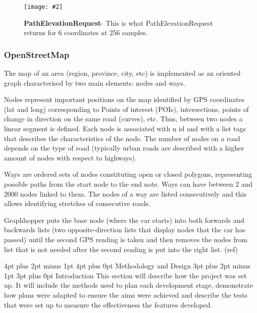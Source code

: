 \documentclass[12pt,a4paper]{article}
\makeatletter
\newcommand{\figuremacro}[5]{
    \begin{figure}[#1]
        \centering
        \texttt{[image: \#2]}
        \caption[#3]{\textbf{#3}#4}
        \label{fig:#2}
    \end{figure}
}
\renewcommand\subsection{\@startsection {subsection}{1}{0mm} %
                               {3pt plus 2pt minus 1pt} %
                               {3pt plus 0pt} %
                               {\normalfont\bfseries}}
\renewcommand\section{\@startsection {section}{1}{0mm} %
                               {4pt plus 2pt minus 1pt} %
                               {4pt plus 0pt} %
                               {\Large\bfseries}}
\makeatother
\begin{document}
\figuremacro{h}{googleElevationPath}{PathElevationRequest}{- This is what PathElevationRequest returns for 6 coordinates at 256 samples.}{0.75} 

\newpage

\subsubsection{OpenStreetMap}
The map of an area (region, province, city, etc) is implemented as an oriented graph characterised by two main elements: nodes and ways.

Nodes represent important positions on the map identified by GPS coordinates (lat and long) corresponding to Points of interest (POIs), intersections, points of change in direction on the same road (curves), etc. Thus, between two nodes a linear segment is defined. Each node is associated with n id and with a list tags that describes the characteristics of the node. The number of nodes on a road depends on the type of road (typically urban roads are described with a higher amount of nodes with respect to highways).

Ways are ordered sets of nodes constituting open or closed polygons, representing possible paths from the start node to the end note. Ways can have between 2 and 2000 nodes linked to them. The nodes of a way are listed consecutively and this allows identifying stretches of consecutive roads. \cite{OpenWiki} 



Graphhopper puts the base node (where the car starts) into both forwards and backwards lists (two opposite-direction lists that display nodes that the car has passed) until the second GPS reading is taken and then removes the nodes from list that is not needed after the second reading is put into the right list. (ref)

\newpage
\section{Methodology and Design}
\subsection{Introduction}
This section will describe how the project was set up. It will include the methods used to plan each development stage, demonstrate how plans were adapted to ensure the aims were achieved and describe the tests that were set up to measure the effectiveness the features developed.
\end{document}
